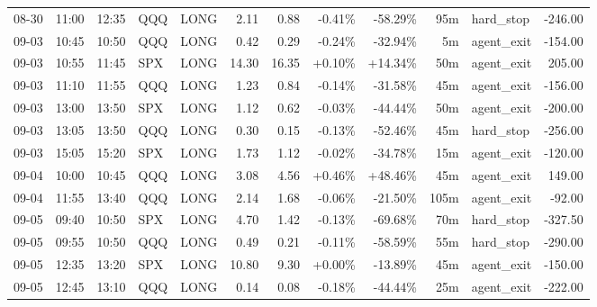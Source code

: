 \documentclass[11pt,a4paper,twoside]{article}
\begin{document}
\begin{center}
\begin{longtable}{>{\color{txtmain}}l l l l l r r r r r >{\color{txtmain}}l r}
08-30 & 11:00 & 12:35 & QQQ & LONG & 2.11 & 0.88 & \textcolor{lossred}{-0.41\%} & \textcolor{lossred}{-58.29\%} & 95m & hard\_stop & \textcolor{lossred}{-246.00} \\
09-03 & 10:45 & 10:50 & QQQ & LONG & 0.42 & 0.29 & \textcolor{lossred}{-0.24\%} & \textcolor{lossred}{-32.94\%} & 5m & agent\_exit & \textcolor{lossred}{-154.00} \\
09-03 & 10:55 & 11:45 & SPX & LONG & 14.30 & 16.35 & \textcolor{wingreen}{+0.10\%} & \textcolor{wingreen}{+14.34\%} & 50m & agent\_exit & \textcolor{wingreen}{205.00} \\
09-03 & 11:10 & 11:55 & QQQ & LONG & 1.23 & 0.84 & \textcolor{lossred}{-0.14\%} & \textcolor{lossred}{-31.58\%} & 45m & agent\_exit & \textcolor{lossred}{-156.00} \\
09-03 & 13:00 & 13:50 & SPX & LONG & 1.12 & 0.62 & \textcolor{lossred}{-0.03\%} & \textcolor{lossred}{-44.44\%} & 50m & agent\_exit & \textcolor{lossred}{-200.00} \\
09-03 & 13:05 & 13:50 & QQQ & LONG & 0.30 & 0.15 & \textcolor{lossred}{-0.13\%} & \textcolor{lossred}{-52.46\%} & 45m & hard\_stop & \textcolor{lossred}{-256.00} \\
09-03 & 15:05 & 15:20 & SPX & LONG & 1.73 & 1.12 & \textcolor{lossred}{-0.02\%} & \textcolor{lossred}{-34.78\%} & 15m & agent\_exit & \textcolor{lossred}{-120.00} \\
09-04 & 10:00 & 10:45 & QQQ & LONG & 3.08 & 4.56 & \textcolor{wingreen}{+0.46\%} & \textcolor{wingreen}{+48.46\%} & 45m & agent\_exit & \textcolor{wingreen}{149.00} \\
09-04 & 11:55 & 13:40 & QQQ & LONG & 2.14 & 1.68 & \textcolor{lossred}{-0.06\%} & \textcolor{lossred}{-21.50\%} & 105m & agent\_exit & \textcolor{lossred}{-92.00} \\
09-05 & 09:40 & 10:50 & SPX & LONG & 4.70 & 1.42 & \textcolor{lossred}{-0.13\%} & \textcolor{lossred}{-69.68\%} & 70m & hard\_stop & \textcolor{lossred}{-327.50} \\
09-05 & 09:55 & 10:50 & QQQ & LONG & 0.49 & 0.21 & \textcolor{lossred}{-0.11\%} & \textcolor{lossred}{-58.59\%} & 55m & hard\_stop & \textcolor{lossred}{-290.00} \\
09-05 & 12:35 & 13:20 & SPX & LONG & 10.80 & 9.30 & \textcolor{wingreen}{+0.00\%} & \textcolor{lossred}{-13.89\%} & 45m & agent\_exit & \textcolor{lossred}{-150.00} \\
09-05 & 12:45 & 13:10 & QQQ & LONG & 0.14 & 0.08 & \textcolor{lossred}{-0.18\%} & \textcolor{lossred}{-44.44\%} & 25m & agent\_exit & \textcolor{lossred}{-222.00} \\

\end{longtable}
\end{center}
\end{document}
